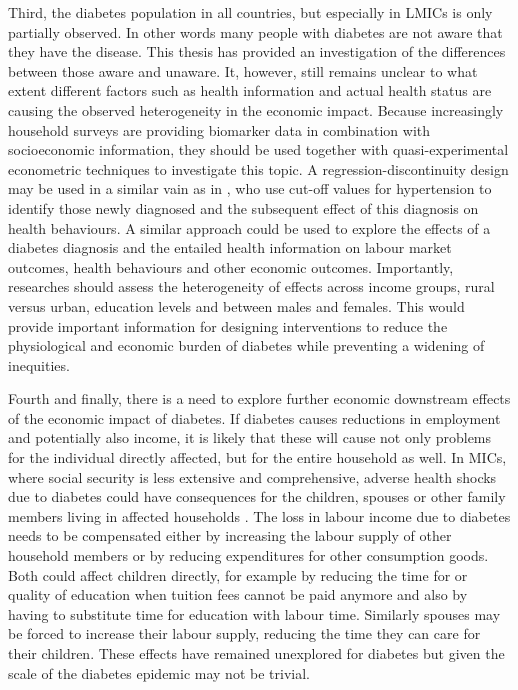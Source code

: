 Third, the diabetes population in all countries, but especially in \acp{LMIC} is only partially observed. In other words many people with diabetes are not aware that they have the disease. This thesis has provided an investigation of the differences between those aware and unaware. It, however, still remains unclear to what extent different factors such as health information and actual health status are causing the observed heterogeneity in the economic impact. Because increasingly household surveys are providing biomarker data in combination with socioeconomic information, they should be used together with quasi-experimental econometric techniques to investigate this topic. A regression-discontinuity design may be used in a similar vain as in \textcite{Zhao2013a}, who use cut-off values for hypertension to identify those newly diagnosed and the subsequent effect of this diagnosis on health behaviours. A similar approach could be used to explore the effects of a diabetes diagnosis and the entailed health information on labour market outcomes, health behaviours and other economic outcomes. Importantly, researches should assess the heterogeneity of effects across income groups, rural versus urban, education levels and between males and females. This would provide important information for designing interventions to reduce the physiological and economic burden of diabetes while preventing a widening of inequities.

Fourth and finally, there is a need to explore further economic downstream effects of the economic impact of diabetes. If diabetes causes reductions in employment and potentially also income, it is likely that these will cause not only problems for the individual directly affected, but for the entire household as well. In \acp{MIC}, where social security is less extensive and comprehensive, adverse health shocks due to diabetes could have consequences for the children, spouses or other family members living in affected households \parencite{Alam2014}. The loss in labour income due to diabetes needs to be compensated either by increasing the labour supply of other household members or by reducing expenditures for other consumption goods. Both could affect children directly, for example by reducing the time for or quality of education when tuition fees cannot be paid anymore and also by having to substitute time for education with labour time. Similarly spouses may be forced to increase their labour supply, reducing the time they can care for their children. These effects have remained unexplored for diabetes but given the scale of the diabetes epidemic may not be trivial.




